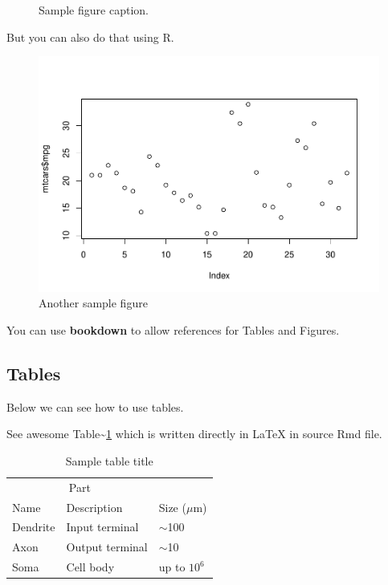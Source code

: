 \documentclass{article}
\newenvironment{Shaded}{\begin{snugshade}}{\end{snugshade}}
\newcommand{\FunctionTok}[1]{\textcolor[rgb]{0.13,0.29,0.53}{\textbf{#1}}}
\newcommand{\NormalTok}[1]{#1}
\newcommand{\SpecialCharTok}[1]{\textcolor[rgb]{0.81,0.36,0.00}{\textbf{#1}}}
\begin{document}
\begin{figure}
  \centering
  \fbox{\rule[-.5cm]{4cm}{4cm} \rule[-.5cm]{4cm}{0cm}}
  \caption{Sample figure caption.}
  \label{fig:fig1}
\end{figure}

But you can also do that using R.

\begin{Shaded}
\end{Shaded}

\begin{figure}
\centering
\includegraphics{210431461_CSC8639_Dissertation_files/figure-latex/fig2-1.pdf}
\caption{Another sample figure}
\end{figure}

You can use \textbf{bookdown} to allow references for Tables and
Figures.

\hypertarget{tables}{%
\subsection{Tables}\label{tables}}

Below we can see how to use tables.

See awesome Table\textasciitilde{}\ref{tab:table} which is written
directly in LaTeX in source Rmd file.

\begin{table}
 \caption{Sample table title}
  \centering
  \begin{tabular}{lll}
    \toprule
    \multicolumn{2}{c}{Part}                   \\
    \cmidrule(r){1-2}
    Name     & Description     & Size ($\mu$m) \\
    \midrule
    Dendrite & Input terminal  & $\sim$100     \\
    Axon     & Output terminal & $\sim$10      \\
    Soma     & Cell body       & up to $10^6$  \\
    \bottomrule
  \end{tabular}
  \label{tab:table}
\end{table}
\end{document}
